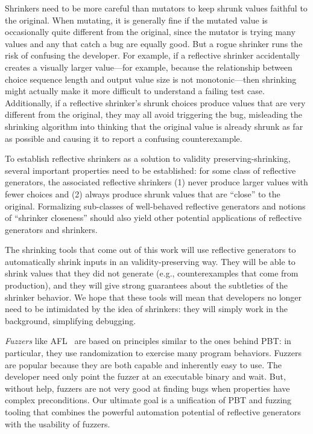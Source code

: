 Shrinkers need to be more careful than mutators to keep shrunk values faithful
to the original. When mutating, it is generally fine if the mutated value is
occasionally quite different from the original, since the mutator is
trying many values and any that catch a bug are equally good. But a rogue
shrinker runs the risk of confusing the developer. For example, if a
reflective shrinker accidentally creates a visually larger
value---for example, because the relationship between choice sequence length and
output value size is not monotonic---then shrinking might actually make it more
difficult to understand a failing test case. Additionally, if a
reflective shrinker's shrunk choices
produce values that are very different from the original, they may all
avoid triggering the bug, misleading the shrinking algorithm into thinking that
the original value is already shrunk as far as possible and causing it to
report a confusing counterexample.

To establish reflective shrinkers as a solution to
validity preserving-shrinking, several important
properties need to be established: for some class of reflective
generators, the associated reflective shrinkers (1) never produce larger values
with fewer choices and (2) always produce shrunk values that are ``close'' to
the original. Formalizing sub-classes of well-behaved reflective generators and
notions of ``shrinker closeness'' should also yield
other potential applications of reflective generators and shrinkers.

The shrinking tools that come out of this work will use reflective generators to
automatically shrink inputs in an validity-preserving way. They will be able to
shrink values that they did not generate (e.g., counterexamples that come from
production), and they will give strong guarantees about the subtleties of the
shrinker behavior. We hope that these tools will mean that developers no longer
need to be intimidated by the idea of shrinkers: they will simply work in the
background, simplifying debugging.

{\em Fuzzers} like AFL~\cite{afl-readme} are based on principles
similar to the
ones behind PBT: in particular, they use randomization to exercise many
program behaviors. Fuzzers are popular because they are both capable and
inherently easy to use. The developer need only point the fuzzer at an
executable binary and
wait. But, without help, fuzzers are not very good at finding
bugs when properties have complex preconditions.
Our ultimate goal is a unification of PBT and fuzzing tooling that combines the
powerful automation potential of reflective generators with the usability of
fuzzers.

